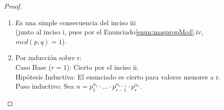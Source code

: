 \begin{proof}
\begin{enumerate}[label=\roman*)]
$=mcd(m,(\quad\quad\quad 0 \quad\quad + c \mod m) \mod m) \quad\quad\quad$ (obvio)\\
$=mcd(m,(c \mod m) \mod m)$ \quad\quad\quad\quad\quad\quad\quad\quad\quad\;\;(obvio) \\
$=mcd(m,(c \mod m))$ \quad\quad\quad\quad\quad\quad\quad \quad\quad\quad\quad\quad\quad\;(por el Enunciado\ref{enun:propMod}.ii) \\
$=mcd(m, c)$ \quad\quad\quad\quad\quad\quad\quad\quad\quad\quad\quad\quad\quad\quad\quad\quad\quad\;\; (por el Enunciado\ref{enun:propMod}.i) \\
$=d$ \quad\quad\quad\quad\quad\quad\quad\quad\quad\quad\quad\quad\quad\quad\quad\quad\quad\quad\quad\quad\quad\quad pues $mcd(m, c)=mcd(c, m)$.\\
Por lo tanto si un elemento $c$ de la primera fila es coprimo con $m \, (d=1)$, toda su columna tiene elementos coprimos con $m$.\\
Y, si un elemento $c$ de la primera fila no es coprimo con $m \, (d>1)$, toda su columna tiene elementos que no son coprimos con $m$.\\
Resumiendo: De toda la tabla que tiene los elementos del $CCR(n \cdot m)$, en la primera fila hay $\phi(m)$ elementos que son coprimos con $m$ (y toda su columna también tiene elementos coprimos con $m$). Todos los elementos de las otras columnas no son coprimos con $m$.\\
En cada columna con elementos que son coprimos con $m$, hay $\phi(n)$ elementos que son coprimos con $n$ .\\
Luego, en total hay $\phi(m) \cdot \phi(n)=\phi(n) \cdot \phi(m)$ elementos que son coprimos con $n$ y que son coprimos con $m$. Luego (por el Enunciado\ref{enun:maspropMcd}.iii) hay $\phi(n) \cdot \phi(m)$\\
elementos que son coprimos con $n \cdot m$, que es exactamente $\phi(n \cdot m)$.
\item Es una simple consecuencia del inciso iii\\
(junto al inciso i, pues por el Enunciado\ref{enun:maspropMcd}.iv, $mcd(p, q)=1$).
\item Por inducción sobre r: \\
Caso Base ($r=1$): Cierto por el inciso ii.\\
Hipótesis Inductiva: El enunciado es cierto para valores menores a r.\\
Paso inductivo: Sea $n=p_{1}^{\alpha_{1}} \cdot \ldots \cdot p_{r-1}^{\alpha_{r-1}} \cdot p_{r}^{\alpha_{r}}$.\\

\end{enumerate}
\end{proof}
